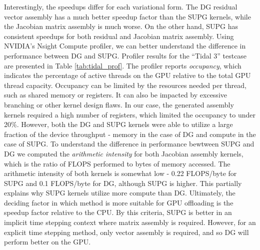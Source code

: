 Interestingly, the speedups differ for each variational form. The DG residual vector assembly has a much better speedup factor than the SUPG kernels, while the Jacobian matrix assembly is much worse. On the other hand, SUPG has consistent speedups for both residual and Jacobian matrix assembly.
Using NVIDIA's Nsight Compute profiler, we can better understand the difference in performance between DG and SUPG.
Profiler results for the ``Tidal 3'' testcase are presented in Table \ref{tab:tidal_prof}. The profiler reports \textit{occupancy}, which indicates the percentage of active threads on the GPU relative to the total GPU thread capacity. Occupancy can be limited by the resources needed per thread, such as shared memory or registers. It can also be impacted by excessive branching or other kernel design flaws. In our case, the generated assembly kernels required a high number of registers, which limited the occupancy to under 20\%. However, both the DG and SUPG kernels were able to utilize a large fraction of the device throughput - memory in the case of DG and compute in the case of SUPG. To understand the difference in performance bewtween SUPG and DG we computed the \textit{arithmetic intensity} for both Jacobian assembly kernels, which is the ratio of FLOPS performed to bytes of memory accessed. The arithmetic intensity of both kernels is somewhat low - 0.22 FLOPS/byte for SUPG and 0.1 FLOPS/byte for DG, although SUPG is higher. This partially explains why SUPG kernels utilize more compute than DG. Ultimately, the deciding factor in which method is more suitable for GPU offloading is the speedup factor relative to the CPU. By this criteria, SUPG is better in an implicit time stepping context where matrix assembly is required. However, for an explicit time stepping method, only vector assembly is required, and so DG will perform better on the GPU.
